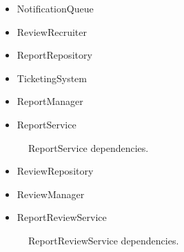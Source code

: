 \begin{itemize}
    \item 
    NotificationQueue
    \item 
    ReviewRecruiter
    \item 
    ReportRepository
    \item 
    TicketingSystem
    \item 
    ReportManager
    \item 
    ReportService
\end{itemize}

\begin{figure}[H]
    \centering
    \caption{\label{fig:ReportService-dependencies}ReportService dependencies.}
\end{figure}

\begin{itemize}
    \item 
    ReviewRepository
    \item 
    ReviewManager
    \item 
    ReportReviewService
\end{itemize}

\begin{figure}[H]
    \centering
    \caption{\label{fig:ReportReviewService-dependencies}ReportReviewService dependencies.}
\end{figure}

